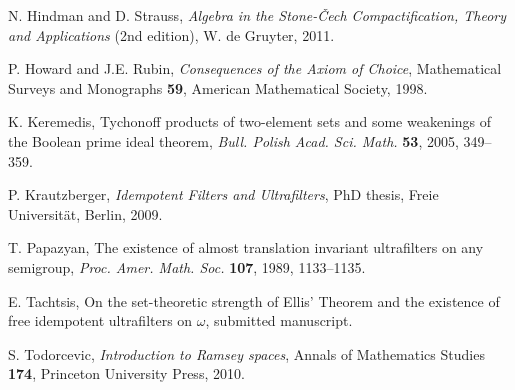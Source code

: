 \documentclass{amsart}
\theoremstyle{definition}
\theoremstyle{remark}
\begin{document}
\begin{thebibliography}{99}
N. Hindman and D. Strauss, \emph{Algebra in the Stone-\v{C}ech
Compactification, Theory and Applications} (2nd edition),
W. de Gruyter, 2011.


P. Howard and J.E. Rubin, 
\emph{Consequences of the Axiom of Choice}, 
Mathematical Surveys and
Monographs \textbf{59}, American Mathematical Society, 1998.

K. Keremedis, Tychonoff products of two-element sets and some weakenings
of the Boolean prime ideal theorem, \emph{Bull. Polish Acad. Sci. Math.} \textbf{53}, 2005, 349--359.

P. Krautzberger, \emph{Idempotent Filters and Ultrafilters},
PhD thesis, Freie Universit\"at, Berlin, 2009.


T. Papazyan, The existence of almost translation invariant ultrafilters 
on any semigroup, \emph{Proc. Amer. Math. Soc.} \textbf{107}, 1989, 1133--1135.

E. Tachtsis,
On the set-theoretic strength of Ellis' Theorem and the
existence of free idempotent ultrafilters on $\omega$,
submitted manuscript.

 S. Todorcevic, 
\emph{Introduction to Ramsey spaces},
Annals of Mathematics Studies \textbf{174},
Princeton University Press, 2010.


\end{thebibliography}
\end{document}

